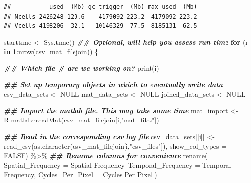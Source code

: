 \documentclass[
]{book}
\newenvironment{Shaded}{\begin{snugshade}}{\end{snugshade}}
\newcommand{\AttributeTok}[1]{\textcolor[rgb]{0.77,0.63,0.00}{#1}}
\newcommand{\ConstantTok}[1]{\textcolor[rgb]{0.00,0.00,0.00}{#1}}
\newcommand{\ControlFlowTok}[1]{\textcolor[rgb]{0.13,0.29,0.53}{\textbf{#1}}}
\newcommand{\DecValTok}[1]{\textcolor[rgb]{0.00,0.00,0.81}{#1}}
\newcommand{\DocumentationTok}[1]{\textcolor[rgb]{0.56,0.35,0.01}{\textbf{\textit{#1}}}}
\newcommand{\FunctionTok}[1]{\textcolor[rgb]{0.00,0.00,0.00}{#1}}
\newcommand{\NormalTok}[1]{#1}
\newcommand{\OtherTok}[1]{\textcolor[rgb]{0.56,0.35,0.01}{#1}}
\newcommand{\SpecialCharTok}[1]{\textcolor[rgb]{0.00,0.00,0.00}{#1}}
\newcommand{\StringTok}[1]{\textcolor[rgb]{0.31,0.60,0.02}{#1}}
\begin{document}
\begin{verbatim}
##           used  (Mb) gc trigger  (Mb) max used  (Mb)
## Ncells 2426248 129.6    4179092 223.2  4179092 223.2
## Vcells 4198206  32.1   10146329  77.5  8185131  62.5
\end{verbatim}

\begin{Shaded}
\begin{Highlighting}[]
\NormalTok{starttime }\OtherTok{\textless{}{-}} \FunctionTok{Sys.time}\NormalTok{() }\DocumentationTok{\#\# Optional, will help you assess run time}
\ControlFlowTok{for}\NormalTok{ (i }\ControlFlowTok{in} \DecValTok{1}\SpecialCharTok{:}\FunctionTok{nrow}\NormalTok{(csv\_mat\_filejoin)) \{}

  \DocumentationTok{\#\# Which file \# are we working on?}
  \FunctionTok{print}\NormalTok{(i)}

  \DocumentationTok{\#\# Set up temporary objects in which to eventually write data}
\NormalTok{  csv\_data\_sets }\OtherTok{\textless{}{-}} \ConstantTok{NULL}
\NormalTok{  mat\_data\_sets }\OtherTok{\textless{}{-}} \ConstantTok{NULL}
\NormalTok{  joined\_data\_sets }\OtherTok{\textless{}{-}} \ConstantTok{NULL}

  \DocumentationTok{\#\# Import the matlab file. This may take some time}
\NormalTok{  mat\_import }\OtherTok{\textless{}{-}}
\NormalTok{    R.matlab}\SpecialCharTok{::}\FunctionTok{readMat}\NormalTok{(csv\_mat\_filejoin[i,}\StringTok{"mat\_files"}\NormalTok{])}

  \DocumentationTok{\#\# Read in the corresponding csv log file}
\NormalTok{  csv\_data\_sets[[i]] }\OtherTok{\textless{}{-}}
    \FunctionTok{read\_csv}\NormalTok{(}\FunctionTok{as.character}\NormalTok{(csv\_mat\_filejoin[i,}\StringTok{"csv\_files"}\NormalTok{]),}
             \AttributeTok{show\_col\_types =} \ConstantTok{FALSE}\NormalTok{) }\SpecialCharTok{\%\textgreater{}\%}
    \DocumentationTok{\#\# Rename columns for convenience}
    \FunctionTok{rename}\NormalTok{(}
      \AttributeTok{Spatial\_Frequency =} \StringTok{\textasciigrave{}}\AttributeTok{Spatial Frequency}\StringTok{\textasciigrave{}}\NormalTok{,}
      \AttributeTok{Temporal\_Frequency =} \StringTok{\textasciigrave{}}\AttributeTok{Temporal Frequency}\StringTok{\textasciigrave{}}\NormalTok{,}
      \AttributeTok{Cycles\_Per\_Pixel =} \StringTok{\textasciigrave{}}\AttributeTok{Cycles Per Pixel}\StringTok{\textasciigrave{}}
\NormalTok{    )}


\end{Highlighting}
\end{Shaded}
\end{document}
